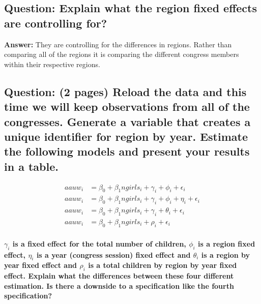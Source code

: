 \documentclass[
]{article}
\begin{document}
\clearpage

\hypertarget{question-explain-what-the-region-fixed-effects-are-controlling-for}{%
\subsection{Question: Explain what the region fixed effects are
controlling
for?}\label{question-explain-what-the-region-fixed-effects-are-controlling-for}}

\textbf{Answer:} They are controlling for the differences in regions.
Rather than comparing all of the regions it is comparing the different
congress members within their respective regions.

\clearpage

\hypertarget{question-2-pages-reload-the-data-and-this-time-we-will-keep-observations-from-all-of-the-congresses.-generate-a-variable-that-creates-a-unique-identifier-for-region-by-year.-estimate-the-following-models-and-present-your-results-in-a-table.}{%
\subsection{Question: (2 pages) Reload the data and this time we will
keep observations from all of the congresses. Generate a variable that
creates a unique identifier for region by year. Estimate the following
models and present your results in a
table.}\label{question-2-pages-reload-the-data-and-this-time-we-will-keep-observations-from-all-of-the-congresses.-generate-a-variable-that-creates-a-unique-identifier-for-region-by-year.-estimate-the-following-models-and-present-your-results-in-a-table.}}

\[
\begin{aligned}
    aauw_i&=\beta_0+\beta_1ngirls_i+\gamma_i+\phi_i+\epsilon_i\\
    aauw_i&=\beta_0+\beta_1ngirls_i+\gamma_i+\phi_i+\eta_i+\epsilon_i\\
    aauw_i&=\beta_0+\beta_1ngirls_i+\gamma_i+\theta_i+\epsilon_i\\
    aauw_i&=\beta_0+\beta_1ngirls_i+\rho_i+\epsilon_i\\
\end{aligned}
\]

\textbf{\(\gamma_i\) is a fixed effect for the total number of children,
\(\phi_i\) is a region fixed effect, \(\eta_i\) is a year (congress
session) fixed effect and \(\theta_i\) is a region by year fixed effect
and \(\rho_i\) is a total children by region by year fixed effect.
Explain what the differences between these four different estimation. Is
there a downside to a specification like the fourth specification? }
\end{document}
